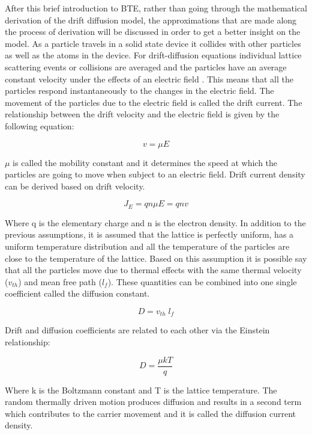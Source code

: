 \begin{doublespace}
After this brief introduction to BTE, rather than going through the mathematical derivation of the drift diffusion model, the approximations that are made along the process of derivation will be discussed in order to get a better insight on the model.  As a particle travels in a solid state device it collides with other particles as well as the atoms in the device. For drift-diffusion equations individual lattice scattering events or collisions are averaged and the particles have an average constant velocity under the effects of an electric field \cite{snowden}. This means that all the particles respond instantaneously to the changes in the electric field. The movement of the particles due to the electric field is called the drift current. The relationship between the drift velocity and the electric field is given by the following equation:

\begin{equation}
v=\mu E
\end{equation}

$\mu$ is called the mobility constant and it determines the speed at which the particles are going to move when subject to an electric field. Drift current density can be derived based on drift velocity.

\begin{equation}
J_E=q n\mu E=q n v 
\end{equation}

Where q is the elementary charge and n is the electron density. In addition to the previous assumptions, it is assumed that the lattice is perfectly uniform, has a uniform temperature distribution and all the temperature of the particles are close to the temperature of the lattice. Based on this assumption it is possible say that all the particles move due to thermal effects with the same thermal velocity ($v_{th}$) and mean free path ($l_f$). These quantities can be combined into one single coefficient called the diffusion constant. 

\begin{equation}
D=v_{th} \;l_f
\end{equation}

Drift and diffusion coefficients are related to each other via the Einstein relationship\cite{snowden}:

\begin{equation}
D=\frac{\mu k T}{q}
\end{equation}

Where k is the Boltzmann constant and T is the lattice temperature. The random thermally driven motion produces diffusion and results in a second term which contributes to the carrier movement and it is called the diffusion current density.


\end{doublespace}
